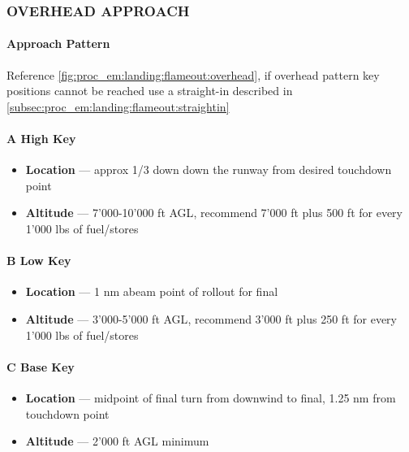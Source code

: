 \subsubsection{OVERHEAD APPROACH}

\paragraph{Approach Pattern}
Reference \cref{fig:proc_em:landing:flameout:overhead}, 
if overhead pattern key positions cannot be reached use a straight-in 
described in \cref{subsec:proc_em:landing:flameout:straightin}

\paragraph{A \quad High Key}
\begin{itemize}
    \item \textbf{Location} --- approx {1/3 down down the runway} from desired touchdown point
    \item \textbf{Altitude} --- {7'000-10'000 ft AGL},
    recommend 7'000 ft plus 500 ft for every 1'000 lbs of fuel/stores
\end{itemize}

\paragraph{B \quad Low Key}
\begin{itemize}
    \item \textbf{Location} --- {1 nm abeam} point of rollout for final 
    \item \textbf{Altitude} --- {3'000-5'000 ft AGL},
    recommend 3'000 ft plus 250 ft for every 1'000 lbs of fuel/stores
\end{itemize}

\paragraph{C \quad Base Key}
\begin{itemize}
    \item \textbf{Location} --- midpoint of final turn from downwind to final,
    1.25 nm from touchdown point
    \item \textbf{Altitude} --- {2'000 ft AGL minimum}
\end{itemize}



